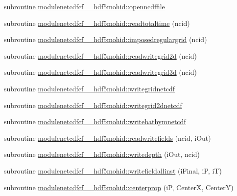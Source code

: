 \begin{DoxyCompactItemize}
\item 
subroutine \mbox{\hyperlink{namespacemodulenetcdfcf__2__hdf5mohid_acf2bf806a4a00a849877321743f4ab04}{modulenetcdfcf\+\_\+\_\+hdf5mohid\+::openncdffile}}
\item 
subroutine \mbox{\hyperlink{namespacemodulenetcdfcf__2__hdf5mohid_acc82dcd56265bba5ab4bdb98fd785e4b}{modulenetcdfcf\+\_\+\_\+hdf5mohid\+::readtotaltime}} (ncid)
\item 
subroutine \mbox{\hyperlink{namespacemodulenetcdfcf__2__hdf5mohid_a9b6bf6f96a105d171c7c2487cabd5c51}{modulenetcdfcf\+\_\+\_\+hdf5mohid\+::imposedregulargrid}} (ncid)
\item 
subroutine \mbox{\hyperlink{namespacemodulenetcdfcf__2__hdf5mohid_a676c74281acb5193758be5405b7e6310}{modulenetcdfcf\+\_\+\_\+hdf5mohid\+::readwritegrid2d}} (ncid)
\item 
subroutine \mbox{\hyperlink{namespacemodulenetcdfcf__2__hdf5mohid_a80bb913f46008900376c9030ad45a641}{modulenetcdfcf\+\_\+\_\+hdf5mohid\+::readwritegrid3d}} (ncid)
\item 
subroutine \mbox{\hyperlink{namespacemodulenetcdfcf__2__hdf5mohid_ab80bf2060093fbfbc2ca158f9f70adc3}{modulenetcdfcf\+\_\+\_\+hdf5mohid\+::writegridnetcdf}}
\item 
subroutine \mbox{\hyperlink{namespacemodulenetcdfcf__2__hdf5mohid_ae7c9e3dcc5e862ce4bcb8836b9f03f77}{modulenetcdfcf\+\_\+\_\+hdf5mohid\+::writegrid2dnetcdf}}
\item 
subroutine \mbox{\hyperlink{namespacemodulenetcdfcf__2__hdf5mohid_a47fc9c2f9553c656c2bee0e119f10b27}{modulenetcdfcf\+\_\+\_\+hdf5mohid\+::writebathymnetcdf}}
\item 
subroutine \mbox{\hyperlink{namespacemodulenetcdfcf__2__hdf5mohid_aebb4610701d55eaa0ab3294968f44ff9}{modulenetcdfcf\+\_\+\_\+hdf5mohid\+::readwritefields}} (ncid, i\+Out)
\item 
subroutine \mbox{\hyperlink{namespacemodulenetcdfcf__2__hdf5mohid_abb91469d951de000f7fa64d1cb05d626}{modulenetcdfcf\+\_\+\_\+hdf5mohid\+::writedepth}} (i\+Out, ncid)
\item 
subroutine \mbox{\hyperlink{namespacemodulenetcdfcf__2__hdf5mohid_af0d01522f1a028b5bded5653f028f1de}{modulenetcdfcf\+\_\+\_\+hdf5mohid\+::writefieldallinst}} (i\+Final, iP, iT)
\item 
subroutine \mbox{\hyperlink{namespacemodulenetcdfcf__2__hdf5mohid_a8712e5cb09686b66d3aa9f8e05e3bd82}{modulenetcdfcf\+\_\+\_\+hdf5mohid\+::centerprop}} (iP, CenterX, CenterY)
\item 

\end{DoxyCompactItemize}
